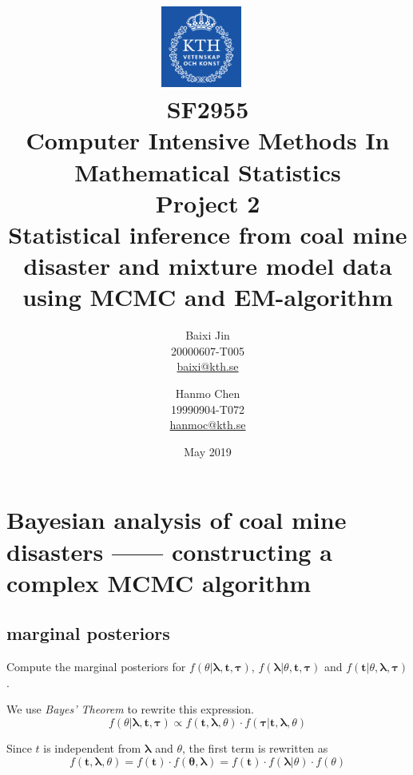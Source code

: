 \documentclass{article}
\begin{document}
\title{
\includegraphics[width=0.2\textwidth]{kthlogo.png}~ 
\\[1cm]
SF2955\\ Computer Intensive Methods In Mathematical Statistics \\Project 2 \\Statistical inference from coal mine disaster and mixture model data using MCMC and EM-algorithm}

\author{Baixi Jin \\ 20000607-T005 \\ \href{mailto:baixi@kth.se}{baixi@kth.se} \and Hanmo Chen \\19990904-T072 \\ \href{mailto:hanmoc@kth.se }{hanmoc@kth.se }}

\date{May 2019}

\maketitle 
\tableofcontents


\section{Bayesian analysis of coal mine disasters —— constructing a complex MCMC algorithm}
\subsection{marginal posteriors}
Compute the marginal posteriors for $f(\theta| \boldsymbol{\lambda}, \boldsymbol{t}, \boldsymbol{\tau})$, $f(\boldsymbol{\lambda}|\theta,\boldsymbol{t},\boldsymbol{\tau})$ and $f(\boldsymbol{t}|\theta, \boldsymbol{\lambda},\boldsymbol{\tau})$. 

We use \textit{Bayes' Theorem} to rewrite this expression.
\[f(\theta| \boldsymbol{\lambda}, \boldsymbol{t}, \boldsymbol{\tau}) \propto f(\boldsymbol{t}, \boldsymbol{\lambda},\theta) \cdot f(\boldsymbol{\tau}| \boldsymbol{t}, \boldsymbol{\lambda},\theta) \]

Since $t$ is independent from $\boldsymbol{\lambda}$ and $\theta$, the first term is rewritten as
\[f(\boldsymbol{t}, \boldsymbol{\lambda},\theta) = f(\boldsymbol{t}) \cdot f(\boldsymbol{\theta},\boldsymbol{\lambda}) = f(\boldsymbol{t}) \cdot f(\boldsymbol{\lambda}|\theta)\cdot f(\theta)\]
\end{document}
